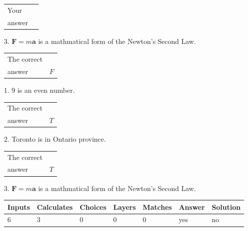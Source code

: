 \documentclass[12pt]{article}
\begin{document}
\noindent\begin{tabular}{|l|l|}\hline Your&\hspace{.2in} \\ answer&\hspace{.2in} \\ \hline \end{tabular}
3.  %
$\mathbf{F}=m\mathbf{a}$ is a mathmatical form of
the Newton's Second Law.
 
 
 
\noindent{}
 
 

 
\noindent\begin{tabular}{|l|l|}\hline The correct & \\
          answer &  %
$F$ \\ \hline \end{tabular}
1. $ %
9$ is an  %
even number.
 
\noindent\begin{tabular}{|l|l|}\hline The correct & \\
          answer &  %
$T$ \\ \hline \end{tabular}
2.  %
Toronto is in  %
Ontario province.
 
\noindent\begin{tabular}{|l|l|}\hline The correct & \\
          answer &  %
$T$ \\ \hline \end{tabular}
3.  %
$\mathbf{F}=m\mathbf{a}$ is a mathmatical form of  %
the Newton's Second Law.
 
 
 
\noindent{}
 
 

 
\vspace{0.3in}
   
   
   
   
\noindent\begin{tabular}{|l|l|l|l|l|l|l|}
 \hline
Inputs & Calculates & Choices & Layers & Matches & Answer & Solution \\ \hline
           6  & 
           3  & 
           0
  & 
           0  & 
           0  & 
  yes & 
  no 
  \\ \hline
 \end{tabular}
   
\end{document}
